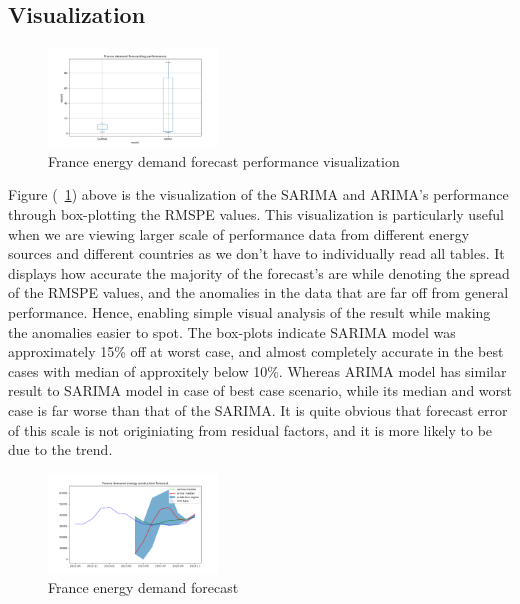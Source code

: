 \documentclass[acmtog]{acmart}
\begin{document}
\subsection{Visualization}

\begin{figure}[htb!]
    \centering
    \includegraphics[width=0.4\textwidth]{figures/Figure_3.png}
    \caption{France energy demand forecast performance visualization}
    \label{fig:demand_performance_forecast} %
\end{figure}

Figure (~\ref{fig:demand_performance_forecast}) above is the visualization of the SARIMA and ARIMA's performance through box-plotting the RMSPE values. This visualization is particularly useful when we are viewing larger scale of performance data from different energy sources and different countries as we don't have to individually read all tables. It displays how accurate the majority of the forecast's are while denoting the spread of the RMSPE values, and the anomalies in the data that are far off from general performance. Hence, enabling simple visual analysis of the result while making the anomalies easier to spot. The box-plots indicate SARIMA model was approximately 15\% off at worst case, and almost completely accurate in the best cases with median of approxitely below 10\%. Whereas ARIMA model has similar result to SARIMA model in case of best case scenario, while its median and worst case is far worse than that of the SARIMA. It is quite obvious that forecast error of this scale is not originiating from residual factors, and it is more likely to be due to the trend. \\


\begin{figure}[htb!]
    \centering
    \includegraphics[width=0.4\textwidth]{figures/Figure_2.png}
    \caption{France energy demand forecast}
    \label{fig:demand_forecast} %
\end{figure}
\end{document}
